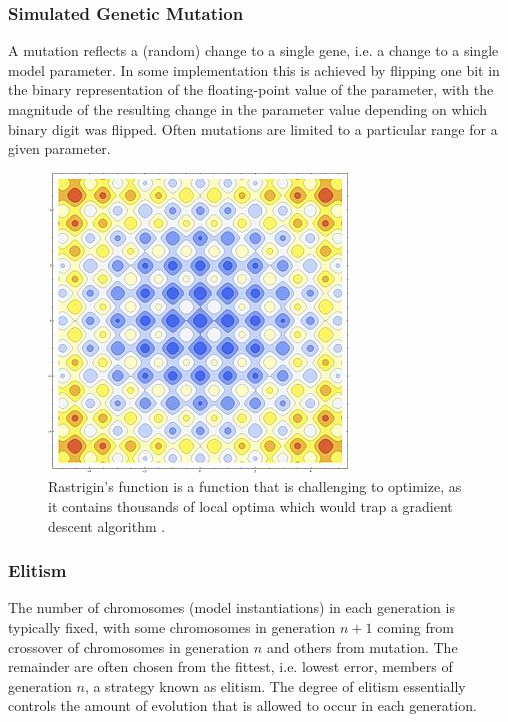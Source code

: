 \subsubsection{Simulated Genetic Mutation}
A mutation reflects a (random) change to a single gene, i.e. a change to a single model parameter.  In some implementation this is achieved by flipping one bit in the binary representation of the floating-point value of the parameter, with the magnitude of the resulting change in the parameter value depending on which binary digit was flipped.  Often mutations are limited to a particular range for a given parameter.
\begin{figure}
\begin{center}

\includegraphics[scale=0.5]{figures/rastagrind}
\caption{Rastrigin's function is a function that is challenging to optimize, as it contains thousands of local optima which would trap a gradient descent algorithm \cite{rastrigin1974systems}.}
\label{fig:rastrigin}

\end{center}

\end{figure}

\subsubsection{Elitism}
The number of chromosomes (model instantiations) in each generation is typically fixed, with some chromosomes in generation $n+1$ coming from crossover of chromosomes in generation $n$ and others from mutation.
The remainder are often chosen from the fittest, i.e. lowest error, members of generation $n$, a strategy known as elitism.
The degree of elitism essentially controls the amount of evolution that is allowed to occur in each generation.

